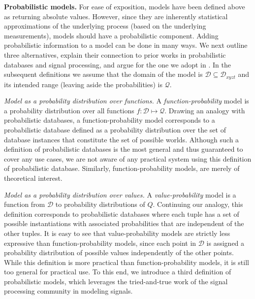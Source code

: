 
\noindent \textbf{Probabilistic models.} For ease of exposition, models have been defined above as returning absolute values. However, since they are inherently statistical approximations of the underlying process (based on the underlying measurements), models should have a probabilistic component. Adding probabilistic information to a model can be done in many ways. We next outline three alternatives, explain their connection to prior works in probabilistic databases and signal processing, and argue for the one we adopt in \projName. In the subsequent definitions we assume that the domain of the model is $\mathcal{D} \subseteq \mathcal{D}_{xyzt}$ and its intended range (leaving aside the probabilities) is $\mathcal{Q}$. 

\noindent \emph{Model as a probability distribution over functions.} A \emph{function-probability} model is a probability distribution over all functions $f:\mathcal{D} \mapsto \mathcal{Q}$. Drawing an analogy with probabilistic databases, a function-probability model corresponds to a probabilistic database defined as a probability distribution over the set of database instances that constitute the set of possible worlds. Although such a definition of probabilistic databases is the most general and thus guaranteed to cover any use cases, we are not aware of any practical system using this definition of probabilistic database. Similarly, function-probability models, are merely of theoretical interest.

\noindent \emph{Model as a probability distribution over values.} A \emph{value-probability} model is a function from $\mathcal{D}$ to probability distributions of $Q$. Continuing our analogy, this definition corresponds to probabilistic databases where each tuple has a set of possible instantiations with associated probabilities that are independent of the other tuples. It is easy to see that value-probability models are strictly less expressive than function-probability models, since each point in $\mathcal{D}$ is assigned a probability distribution of possible values independently of the other points. While this definition is more practical than function-probability models, it is still too general for practical use. To this end, we introduce a third definition of probabilistic models, which leverages the tried-and-true work of the signal processing community in modeling signals.

